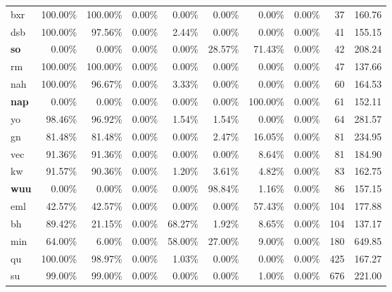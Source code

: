 \begin{table*}[hbt!]
{\begin{tabular}{l|rrrr|rrr|rr}
            bxr          & 100.00\% & 100.00\% & 0.00\% & 0.00\%  & 0.00\%   & 0.00\%   & 0.00\% & 37           & 160.76     \\
            dsb          & 100.00\% & 97.56\%  & 0.00\% & 2.44\%  & 0.00\%   & 0.00\%   & 0.00\% & 41           & 155.15     \\
            \textbf{so}  & 0.00\%   & 0.00\%   & 0.00\% & 0.00\%  & 28.57\%  & 71.43\%  & 0.00\% & 42           & 208.24     \\
            rm           & 100.00\% & 100.00\% & 0.00\% & 0.00\%  & 0.00\%   & 0.00\%   & 0.00\% & 47           & 137.66     \\
            nah          & 100.00\% & 96.67\%  & 0.00\% & 3.33\%  & 0.00\%   & 0.00\%   & 0.00\% & 60           & 164.53     \\
            \textbf{nap} & 0.00\%   & 0.00\%   & 0.00\% & 0.00\%  & 0.00\%   & 100.00\% & 0.00\% & 61           & 152.11     \\
            yo           & 98.46\%  & 96.92\%  & 0.00\% & 1.54\%  & 1.54\%   & 0.00\%   & 0.00\% & 64           & 281.57     \\
            gn           & 81.48\%  & 81.48\%  & 0.00\% & 0.00\%  & 2.47\%   & 16.05\%  & 0.00\% & 81           & 234.95     \\
            vec          & 91.36\%  & 91.36\%  & 0.00\% & 0.00\%  & 0.00\%   & 8.64\%   & 0.00\% & 81           & 184.90     \\
            kw           & 91.57\%  & 90.36\%  & 0.00\% & 1.20\%  & 3.61\%   & 4.82\%   & 0.00\% & 83           & 162.75     \\
            \textbf{wuu} & 0.00\%   & 0.00\%   & 0.00\% & 0.00\%  & 98.84\%  & 1.16\%   & 0.00\% & 86           & 157.15     \\
            eml          & 42.57\%  & 42.57\%  & 0.00\% & 0.00\%  & 0.00\%   & 57.43\%  & 0.00\% & 104          & 177.88     \\
            bh           & 89.42\%  & 21.15\%  & 0.00\% & 68.27\% & 1.92\%   & 8.65\%   & 0.00\% & 104          & 137.17     \\
            min          & 64.00\%  & 6.00\%   & 0.00\% & 58.00\% & 27.00\%  & 9.00\%   & 0.00\% & 180          & 649.85     \\
            qu           & 100.00\% & 98.97\%  & 0.00\% & 1.03\%  & 0.00\%   & 0.00\%   & 0.00\% & 425          & 167.27     \\
            su           & 99.00\%  & 99.00\%  & 0.00\% & 0.00\%  & 0.00\%   & 1.00\%   & 0.00\% & 676          & 221.00     \\

\end{tabular}}
\end{table*}
